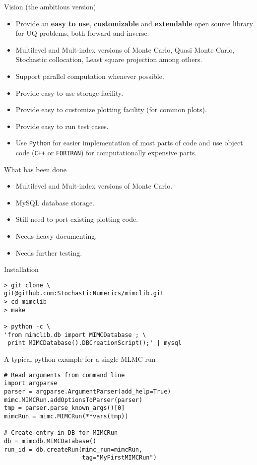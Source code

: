 {
\nofooter \noheader \frame[noframenumbering]{\titlepage}
}

\begin{frame}{Vision (the ambitious version)}
  \begin{itemize}
  \item Provide an \textbf{easy to use}, \textbf{customizable} and
    \textbf{extendable} open source library for UQ problems, both
    forward and inverse.
  \item Multilevel and Mult-index versions of Monte Carlo, Quasi Monte
    Carlo, Stochastic collocation, Least square projection among
    others.
  \item Support parallel computation whenever possible.
  \item Provide easy to use storage facility.
  \item Provide easy to customize plotting facility (for common
    plots).
  \item Provide easy to run test cases.
  \item Use \texttt{Python} for easier implementation of most parts of code
    and use object code (\texttt{C++} or \texttt{FORTRAN}) for
    computationally expensive parts.
  \end{itemize}
\end{frame}

\begin{frame}{What has been done}
  \begin{itemize}
  \item Multilevel and Mult-index versions of Monte Carlo.
  \item MySQL database storage.
  \item Still need to port existing plotting code.
  \item Needs heavy documenting.
  \item Needs further testing.
  \end{itemize}
\end{frame}

\begin{frame}[fragile]{Installation}
\begin{verbatim}
> git clone \
git@github.com:StochasticNumerics/mimclib.git
> cd mimclib
> make

> python -c \
'from mimclib.db import MIMCDatabase ; \
 print MIMCDatabase().DBCreationScript();' | mysql
\end{verbatim}
\end{frame}

\begin{frame}[fragile]{A typical python example for a single MLMC run}
\begin{verbatim}
# Read arguments from command line
import argparse
parser = argparse.ArgumentParser(add_help=True)
mimc.MIMCRun.addOptionsToParser(parser)
tmp = parser.parse_known_args()[0]
mimcRun = mimc.MIMCRun(**vars(tmp))

# Create entry in DB for MIMCRun
db = mimcdb.MIMCDatabase()
run_id = db.createRun(mimc_run=mimcRun,
                      tag="MyFirstMIMCRun")
\end{verbatim}
\end{frame}


